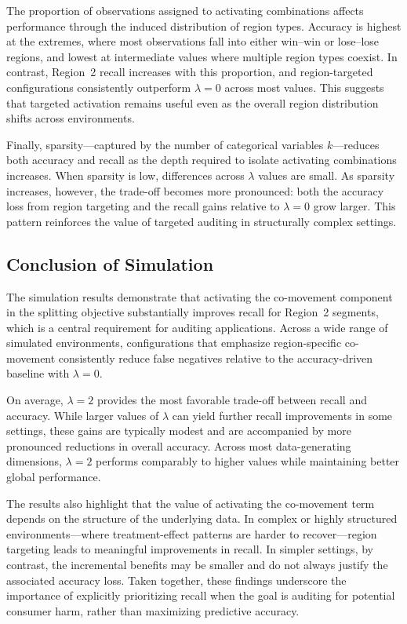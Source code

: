 \documentclass[11pt,letterpaper,english]{article}
\theoremstyle{definition}
\theoremstyle{definition}
\begin{document}
\begin{bibunit}
The proportion of observations assigned to activating combinations affects performance through the induced distribution of region types. Accuracy is highest at the extremes, where most observations fall into either win--win or lose--lose regions, and lowest at intermediate values where multiple region types coexist. In contrast, Region~2 recall increases with this proportion, and region-targeted configurations consistently outperform $\lambda = 0$ across most values. This suggests that targeted activation remains useful even as the overall region distribution shifts across environments.

Finally, sparsity—captured by the number of categorical variables $k$—reduces both accuracy and recall as the depth required to isolate activating combinations increases. When sparsity is low, differences across $\lambda$ values are small. As sparsity increases, however, the trade-off becomes more pronounced: both the accuracy loss from region targeting and the recall gains relative to $\lambda = 0$ grow larger. This pattern reinforces the value of targeted auditing in structurally complex settings.

\subsection{Conclusion of Simulation}

The simulation results demonstrate that activating the co-movement component in the splitting objective substantially improves recall for Region~2 segments, which is a central requirement for auditing applications. Across a wide range of simulated environments, configurations that emphasize region-specific co-movement consistently reduce false negatives relative to the accuracy-driven baseline with $\lambda = 0$.

On average, $\lambda = 2$ provides the most favorable trade-off between recall and accuracy. While larger values of $\lambda$ can yield further recall improvements in some settings, these gains are typically modest and are accompanied by more pronounced reductions in overall accuracy. Across most data-generating dimensions, $\lambda = 2$ performs comparably to higher values while maintaining better global performance.

The results also highlight that the value of activating the co-movement term depends on the structure of the underlying data. In complex or highly structured environments—where treatment-effect patterns are harder to recover—region targeting leads to meaningful improvements in recall. In simpler settings, by contrast, the incremental benefits may be smaller and do not always justify the associated accuracy loss. Taken together, these findings underscore the importance of explicitly prioritizing recall when the goal is auditing for potential consumer harm, rather than maximizing predictive accuracy.



\end{bibunit}
\end{document}
